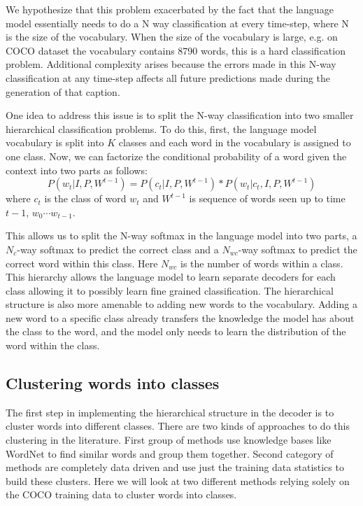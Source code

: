 We hypothesize that this problem exacerbated by the fact that the language model
essentially needs to do a N way classification at every time-step, where N is
the size of the vocabulary.
When the size of the vocabulary is large, e.g. on COCO dataset the vocabulary
contains 8790 words, this is a hard classification problem.
Additional complexity arises because the errors made in this N-way
classification at any time-step affects all future predictions made during the
generation of that caption.

One idea to address this issue is to split the N-way classification into two
smaller hierarchical classification problems.
To do this, first, the language model vocabulary is split into $K$ classes and
each word in the vocabulary is assigned to one class. 
Now, we can factorize the conditional probability of a word given the context
into two parts as follows:
\begin{equation}
  \label{eq:class} 
  P(w_t | I,P, W^{t-1}) = P(c_t| I,P, W^{t-1})*P(w_t | c_t, I,P,W^{t-1})
\end{equation}
\noindent where $c_t$ is the class of word $w_t$ and $W^{t-1}$ is sequence of words
seen up to time $t-1$, $w_0\cdots w_{t-1}$.

This allows us to split the N-way softmax in the language model into two
parts, a $N_c$-way softmax to predict the correct class and a $N_{wc}$-way
softmax to predict the correct word within this class.
Here $N_{wc}$ is the number of words within a class.
This hierarchy allows the language model to learn separate decoders for each
class allowing it to possibly learn fine grained classification.
The hierarchical structure is also more amenable to adding new words to the vocabulary.
Adding a new word to a specific class already transfers the knowledge the model
has about the class to the word, and the model only needs to learn the
distribution of the word within the class.

\subsection{Clustering words into classes}
The first step in implementing the hierarchical structure in the decoder is to
cluster words into different classes.
There are two kinds of approaches to do this clustering in the literature.
First group of methods use knowledge bases like WordNet to find similar words
and group them together.
Second category of methods are completely data driven and use just the training
data statistics to build these clusters.
Here we will look at two different methods relying solely on the COCO training
data to cluster words into classes.

